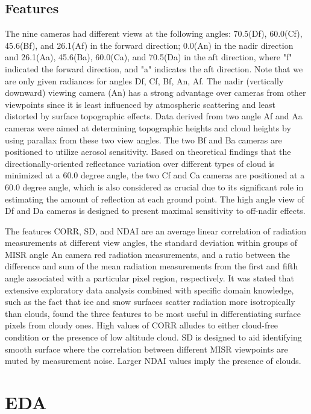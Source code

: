 \documentclass{article}\usepackage[]{graphicx}\usepackage[]{color}
\begin{document}
\subsection{Features} The nine cameras had different views at the following angles: 70.5\textdegree (Df), 60.0\textdegree (Cf), 45.6\textdegree (Bf), and 26.1\textdegree (Af) in the forward direction; 0.0\textdegree (An) in the nadir direction and 26.1\textdegree (Aa), 45.6\textdegree (Ba), 60.0\textdegree (Ca), and 70.5\textdegree (Da) in the aft direction, where "f" indicated the forward
direction, and "a" indicates the aft direction. Note that we are only given radiances for angles Df, Cf, Bf, An, Af. The nadir (vertically downward) viewing camera (An) has a strong advantage over cameras from other viewpoints since it is least influenced by atmospheric scattering and least distorted by surface topographic effects. Data derived from two angle Af and Aa cameras were aimed at determining topographic heights and cloud heights by using parallax from these two view angles. The two Bf and Ba cameras are positioned to utilize aerosol sensitivity. Based on theoretical findings that the directionally-oriented reflectance variation over different types of cloud is minimized at a 60.0 degree angle, the two Cf and Ca cameras are positioned at a 60.0 degree angle, which is also considered as crucial due to its significant role in estimating the amount of reflection at each ground point. The high angle view of Df and Da cameras is designed to present maximal sensitivity to off-nadir effects. 

The features CORR, SD, and NDAI are an average linear correlation of radiation measurements at different view angles, the standard deviation within groups of MISR angle An camera red radiation measurements, and a ratio between the difference and sum of the mean radiation measurements from the first and fifth angle associated with a particular pixel region, respectively. It was stated that extensive exploratory data analysis combined with specific domain knowledge, such as the fact that ice and snow surfaces scatter radiation more isotropically than clouds, found the three features to be most useful in differentiating surface pixels from cloudy ones. High values of CORR alludes to either cloud-free condition or the presence of low altitude cloud. SD is designed to aid identifying smooth surface where the correlation between different MISR viewpoints are muted by measurement noise. Larger NDAI values imply the presence of clouds.

\section{EDA}
\end{document}
